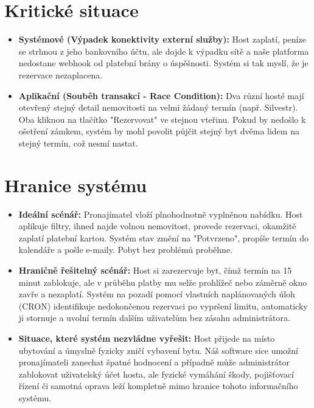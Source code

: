 \documentclass[11pt, a4paper]{article}
\begin{document}
\section{Kritické situace}

\begin{itemize}
    \item \textbf{Systémové (Výpadek konektivity externí služby):} Host zaplatí, peníze se strhnou z jeho bankovního účtu, ale dojde k výpadku sítě a naše platforma nedostane webhook od platební brány o úspěšnosti. Systém si tak myslí, že je rezervace nezaplacena.
    \item \textbf{Aplikační (Souběh transakcí - Race Condition):} Dva různí hosté mají otevřený stejný detail nemovitosti na velmi žádaný termín (např. Silvestr). Oba kliknou na tlačítko "Rezervovat" ve stejnou vteřinu. Pokud by nedošlo k ošetření zámkem, systém by mohl povolit půjčit stejný byt dvěma lidem na stejný termín, což nesmí nastat.
\end{itemize}

\section{Hranice systému}

\begin{itemize}
    \item \textbf{Ideální scénář:} Pronajímatel vloží plnohodnotně vyplněnou nabídku. Host aplikuje filtry, ihned najde volnou nemovitost, provede rezervaci, okamžitě zaplatí platební kartou. Systém stav změní na "Potvrzeno", propíše termín do kalendáře a pošle e-maily. Pobyt bez problémů proběhne.
    
    \item \textbf{Hraničně řešitelný scénář:} Host si zarezervuje byt, čímž termín na 15 minut zablokuje, ale v průběhu platby mu selže prohlížeč nebo záměrně okno zavře a nezaplatí. Systém na pozadí pomocí vlastních naplánovaných úloh (CRON) identifikuje nedokončenou rezervaci po vypršení limitu, automaticky ji stornuje a uvolní termín dalším uživatelům bez zásahu administrátora.
    
    \item \textbf{Situace, které systém nezvládne vyřešit:} Host přijede na místo ubytování a úmyslně fyzicky zničí vybavení bytu. Náš software sice umožní pronajímateli zanechat špatné hodnocení a případně může administrátor zablokovat uživatelský účet hosta, ale fyzické vymáhání škody, pojišťovací řízení či samotná oprava leží kompletně mimo hranice tohoto informačního systému.
\end{itemize}
\end{document}
